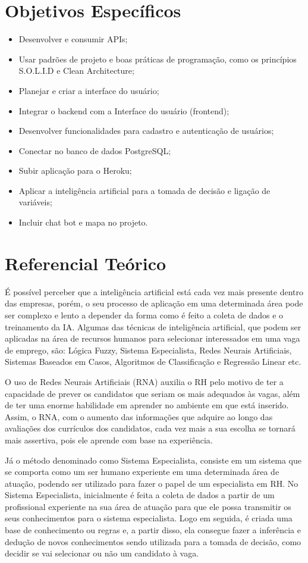 \documentclass[conference]{IEEEtran}
\begin{document}
\section{Objetivos Específicos}
\begin{itemize}
\item Desenvolver e consumir APIs; 
\item Usar padrões de projeto e boas práticas de programação, como os princípios S.O.L.I.D e Clean Architecture; 
\item Planejar e criar a interface do usuário;
\item Integrar o backend com a Interface do usuário (frontend); 
\item Desenvolver funcionalidades para cadastro e autenticação de usuários;
\item Conectar no banco de dados PostgreSQL;
\item Subir aplicação para o Heroku;
\item Aplicar a inteligência artificial para a tomada de decisão e ligação de variáveis;
\item Incluir chat bot e mapa no projeto.
\end{itemize}

\section{Referencial Teórico}
É possível perceber que a inteligência artificial está cada vez mais presente dentro das empresas, porém, o seu processo de aplicação em uma determinada área pode ser complexo e lento a depender da forma como é feito a coleta de dados e o treinamento da IA. Algumas das técnicas de inteligência artificial, que podem ser aplicadas na área de recursos humanos para selecionar interessados em uma vaga de emprego, são: Lógica Fuzzy, Sistema Especialista, Redes Neurais Artificiais, Sistemas Baseados em Casos, Algoritmos de Classificação e Regressão Linear etc.

O uso de Redes Neurais Artificiais (RNA) auxilia o RH pelo motivo de ter a capacidade de prever os candidatos que seriam os mais adequados às vagas, além de ter uma enorme habilidade em aprender no ambiente em que está inserido. Assim, o RNA, com o aumento das informações que adquire ao longo das avaliações dos currículos dos candidatos, cada vez mais a sua escolha se tornará mais assertiva, pois ele aprende com base na experiência.

Já o método denominado como Sistema Especialista, consiste em um sistema que se comporta como um ser humano experiente em uma determinada área de atuação, podendo ser utilizado para fazer o papel de um especialista em RH. No Sistema Especialista, inicialmente é feita a coleta de dados a partir de um profissional experiente na sua área de atuação para que ele possa transmitir os seus conhecimentos para o sistema especialista. Logo em seguida, é criada uma base de conhecimento ou regras e, a partir disso, ela consegue fazer a inferência e dedução de novos conhecimentos sendo utilizada para a tomada de decisão, como decidir se vai selecionar ou não um candidato à vaga. 
\end{document}
